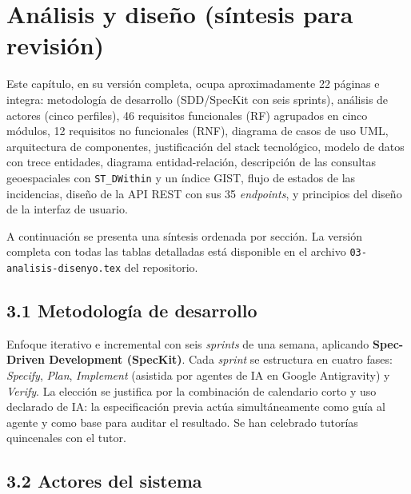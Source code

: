 
\chapter{Análisis y diseño (síntesis para revisión)}
\label{ch:analisis-disenyo-resumen}

Este capítulo, en su versión completa, ocupa aproximadamente 22 páginas e integra: metodología de desarrollo (SDD/SpecKit con seis sprints), análisis de actores (cinco perfiles), 46 requisitos funcionales (RF) agrupados en cinco módulos, 12 requisitos no funcionales (RNF), diagrama de casos de uso UML, arquitectura de componentes, justificación del stack tecnológico, modelo de datos con trece entidades, diagrama entidad-relación, descripción de las consultas geoespaciales con \texttt{ST\_DWithin} y un índice GIST, flujo de estados de las incidencias, diseño de la API REST con sus 35 \textit{endpoints}, y principios del diseño de la interfaz de usuario.

A continuación se presenta una síntesis ordenada por sección. La versión completa con todas las tablas detalladas está disponible en el archivo \texttt{03-analisis-disenyo.tex} del repositorio.


\section*{3.1 Metodología de desarrollo}

Enfoque iterativo e incremental con seis \textit{sprints} de una semana, aplicando \textbf{Spec-Driven Development (SpecKit)}. Cada \textit{sprint} se estructura en cuatro fases: \textit{Specify}, \textit{Plan}, \textit{Implement} (asistida por agentes de IA en Google Antigravity) y \textit{Verify}. La elección se justifica por la combinación de calendario corto y uso declarado de IA: la especificación previa actúa simultáneamente como guía al agente y como base para auditar el resultado. Se han celebrado tutorías quincenales con el tutor.


\section*{3.2 Actores del sistema}

